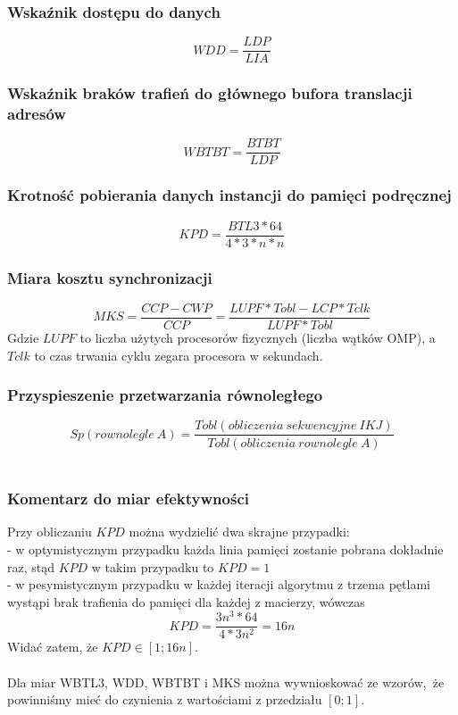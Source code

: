 \documentclass[10pt,a4paper]{article}
\begin{document}
\subsubsection*{Wskaźnik dostępu do danych}
\begin{equation}
	WDD = \frac{LDP}{LIA}
\end{equation}
\subsubsection*{Wskaźnik braków trafień do głównego bufora translacji adresów}
\begin{equation}
	WBTBT = \frac{BTBT}{LDP}
\end{equation}
\subsubsection*{Krotność pobierania danych instancji do pamięci podręcznej}
\begin{equation}
	KPD = \frac{BTL3 * 64}{4 * 3 * n * n}
\end{equation}
\subsubsection*{Miara kosztu synchronizacji}
\begin{equation}
	MKS = \frac{CCP - CWP}{CCP} = \frac{LUPF * Tobl - LCP * Tclk}{LUPF * Tobl}
\end{equation}
Gdzie $LUPF$ to liczba użytych procesorów fizycznych (liczba wątków OMP), a $Tclk$
to czas trwania cyklu zegara procesora w sekundach.
\subsubsection*{Przyspieszenie przetwarzania równoległego}
\begin{equation}
	Sp(rownolegle\: A) = \frac{Tobl(obliczenia \: sekwencyjne \: IKJ)}{Tobl(obliczenia \: rownolegle \: A)}
\end{equation}
\\
\subsubsection*{Komentarz do miar efektywności}
Przy obliczaniu $KPD$ można wydzielić dwa skrajne przypadki: \\
- w optymistycznym przypadku każda linia pamięci zostanie pobrana dokładnie raz,
stąd $KPD$ w takim przypadku to $KPD = 1$\\
- w pesymistycznym przypadku w każdej iteracji algorytmu z trzema pętlami wystąpi
brak trafienia do pamięci dla każdej z macierzy, wówczas 
\begin{equation}
	KPD = \frac{3n^3 * 64}{4 * 3n^2} = 16n
\end{equation}
Widać zatem, że $KPD \in [1; 16n]$.\\
\\
Dla miar WBTL3, WDD, WBTBT i MKS można wywnioskować ze wzorów, że powinniśmy mieć do czynienia
z wartościami z przedziału $[0;1]$.
	
\end{document}
